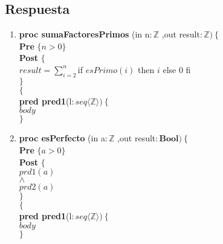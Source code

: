 \documentclass[a4paper]{article}
\begin{document}
\subsection*{Respuesta}
	\begin{enumerate}[label=\alph*)]
		\item
			
			\textbf{proc sumaFactoresPrimos }(in n$:\mathbb{Z}$
				,out result$: \mathbb{Z} )\ \{$\smallskip \\
			\hspace*{6mm} \textbf{Pre }$\{n>0 \}$\smallskip \\
			\hspace*{6mm} \textbf{Post }$\{$\\
			\hspace*{6mm} $result=\sum_{i=2}^{n}$if $esPrimo(i)$ then $i$ else 0 fi\\
			\hspace*{6mm} $\}$\\
			$\{$\smallskip \\
			
			\textbf{pred pred1}(l$: seq\langle \mathbb{Z}\rangle)\ \{$\smallskip \\
			\hspace*{6mm}$body$\\
			$\}$			
			
		\item
			
			\textbf{proc esPerfecto }(in a$:\mathbb{Z}$
				,out result$:\textbf{Bool} )\ \{$\smallskip \\
			\hspace*{6mm} \textbf{Pre }$\{a>0 \}$\smallskip \\
			\hspace*{6mm} \textbf{Post }$\{$\\
			\hspace*{6mm} $prd1(a)$\\
			\hspace*{6mm} $\wedge$\\
			\hspace*{6mm} $prd2(a)$\\
			\hspace*{6mm} $\}$\\
			$\{$\smallskip \\
			
			\textbf{pred pred1}(l$: seq\langle \mathbb{Z}\rangle)\ \{$\smallskip \\
			\hspace*{6mm}$body$\\
			$\}$	
			

\end{enumerate}
\end{document}
